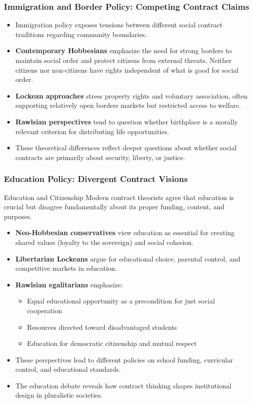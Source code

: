 \documentclass[aspectratio=169]{beamer}
\begin{document}
\begin{frame}
  \frametitle{Immigration and Border Policy: Competing Contract Claims}
  
  \begin{itemize}
    \item Immigration policy exposes tensions between different social contract traditions regarding community boundaries.
    \item \textbf{Contemporary Hobbesians} emphasize the need for strong borders to maintain social order and protect citizens from external threats. Neither citizens nor non-citizens have rights independent of what is good for social order.
    \item \textbf{Lockean approaches} stress property rights and voluntary association, often supporting relatively open borders markets but restricted access to welfare.
    \item \textbf{Rawlsian perspectives} tend to question whether birthplace is a morally relevant criterion for distributing life opportunities.
    \item These theoretical differences reflect deeper questions about whether social contracts are primarily about security, liberty, or justice.
  \end{itemize}
\end{frame}

\begin{frame}
  \frametitle{Education Policy: Divergent Contract Visions}
  
  \begin{alertblock}{Education and Citizenship}
    Modern contract theorists agree that education is crucial but disagree fundamentally about its proper funding, content, and purposes.
  \end{alertblock}
  
  \begin{itemize}
    \item \textbf{Neo-Hobbesian conservatives} view education as essential for creating shared values (loyalty to the sovereign) and social cohesion.
    \item \textbf{Libertarian Lockeans} argue for educational choice, parental control, and competitive markets in education.
    \item \textbf{Rawlsian egalitarians} emphasize:
      \begin{itemize}
        \item Equal educational opportunity as a precondition for just social cooperation
        \item Resources directed toward disadvantaged students
        \item Education for democratic citizenship and mutual respect
      \end{itemize}
    \item These perspectives lead to different policies on school funding, curricular control, and educational standards.
    \item The education debate reveals how contract thinking shapes institutional design in pluralistic societies.
  \end{itemize}
\end{frame}
\end{document}
